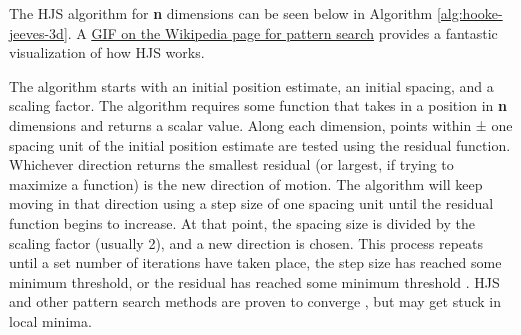 \documentclass[11pt]{ucthesisCP}
\begin{document}
The HJS algorithm for \textbf{n} dimensions can be seen below in Algorithm \ref{alg:hooke-jeeves-3d}. A \href{https://en.wikipedia.org/wiki/Pattern\_search\_(optimization)\#/media/File:Direct\_search\_BROYDEN.gif}{\ul{GIF on the Wikipedia page for pattern search}} provides a fantastic visualization of how HJS works. 

The algorithm starts with an initial position estimate, an initial spacing, and a scaling factor. The algorithm requires some function that takes in a position in \textbf{n} dimensions and returns a scalar value. Along each dimension, points within ± one spacing unit of the initial position estimate are tested using the residual function. Whichever direction returns the smallest residual (or largest, if trying to maximize a function) is the new direction of motion. The algorithm will keep moving in that direction using a step size of one spacing unit until the residual function begins to increase. At that point, the spacing size is divided by the scaling factor (usually 2), and a new direction is chosen. This process repeats until a set number of iterations have taken place, the step size has reached some minimum threshold, or the residual has reached some minimum threshold \cite{hjsstan}. HJS and other pattern search methods are proven to converge \cite{hjsconv}, but may get stuck in local minima.
\end{document}
